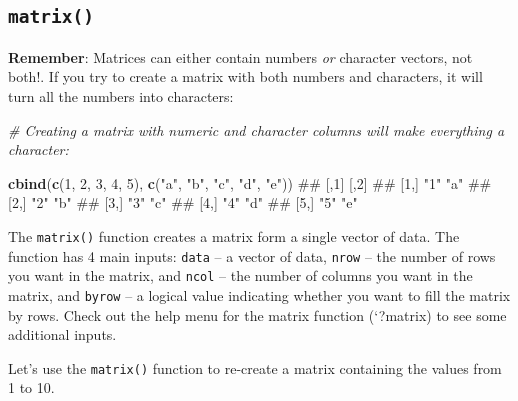 \documentclass[]{book}
\newenvironment{Shaded}{\begin{snugshade}}{\end{snugshade}}
\newcommand{\KeywordTok}[1]{\textcolor[rgb]{0.13,0.29,0.53}{\textbf{{#1}}}}
\newcommand{\DecValTok}[1]{\textcolor[rgb]{0.00,0.00,0.81}{{#1}}}
\newcommand{\StringTok}[1]{\textcolor[rgb]{0.31,0.60,0.02}{{#1}}}
\newcommand{\CommentTok}[1]{\textcolor[rgb]{0.56,0.35,0.01}{\textit{{#1}}}}
\newcommand{\NormalTok}[1]{{#1}}
\theoremstyle{definition}
\theoremstyle{definition}
\theoremstyle{remark}
\begin{document}
\subsection{\texorpdfstring{\texttt{matrix()}}{matrix()}}\label{matrix}

\textbf{Remember}: Matrices can either contain numbers \emph{or}
character vectors, not both!. If you try to create a matrix with both
numbers and characters, it will turn all the numbers into characters:

\begin{Shaded}
\begin{Highlighting}[]
\CommentTok{# Creating a matrix with numeric and character columns will make everything a character:}

\KeywordTok{cbind}\NormalTok{(}\KeywordTok{c}\NormalTok{(}\DecValTok{1}\NormalTok{, }\DecValTok{2}\NormalTok{, }\DecValTok{3}\NormalTok{, }\DecValTok{4}\NormalTok{, }\DecValTok{5}\NormalTok{),}
      \KeywordTok{c}\NormalTok{(}\StringTok{"a"}\NormalTok{, }\StringTok{"b"}\NormalTok{, }\StringTok{"c"}\NormalTok{, }\StringTok{"d"}\NormalTok{, }\StringTok{"e"}\NormalTok{))}
\NormalTok{##      [,1] [,2]}
\NormalTok{## [1,] "1"  "a" }
\NormalTok{## [2,] "2"  "b" }
\NormalTok{## [3,] "3"  "c" }
\NormalTok{## [4,] "4"  "d" }
\NormalTok{## [5,] "5"  "e"}
\end{Highlighting}
\end{Shaded}

The \texttt{matrix()} function creates a matrix form a single vector of
data. The function has 4 main inputs: \texttt{data} -- a vector of data,
\texttt{nrow} -- the number of rows you want in the matrix, and
\texttt{ncol} -- the number of columns you want in the matrix, and
\texttt{byrow} -- a logical value indicating whether you want to fill
the matrix by rows. Check out the help menu for the matrix function
(`?matrix) to see some additional inputs.

Let's use the \texttt{matrix()} function to re-create a matrix
containing the values from 1 to 10.
\end{document}
